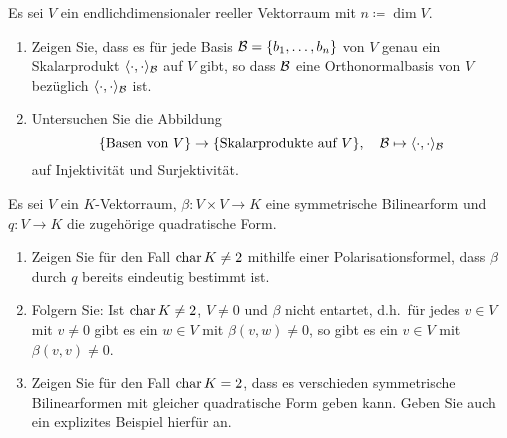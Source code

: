 \documentclass[a4paper,10pt]{scrartcl}
\begin{document}
\begin{question}
  Es sei $V$ ein endlichdimensionaler reeller Vektorraum mit $n \coloneqq \dim V$.
  \begin{enumerate}
    \item
      Zeigen Sie, dass es für jede Basis $\mathcal{B} = \{b_1, \dotsc, b_n\}$ von $V$ genau ein Skalarprodukt $\langle \cdot, \cdot \rangle_{\mathcal{B}}$ auf $V$ gibt, so dass $\mathcal{B}$ eine Orthonormalbasis von $V$ bezüglich $\langle \cdot, \cdot \rangle_{\mathcal{B}}$ ist.
    \item
      Untersuchen Sie die Abbildung
      \[
        \{\text{Basen von $V$}\} \to \{\text{Skalarprodukte auf $V$}\},
        \quad
        \mathcal{B} \mapsto \langle \cdot, \cdot \rangle_{\mathcal{B}}
      \]
      auf Injektivität und Surjektivität.
  \end{enumerate}
\end{question}














\begin{question}
  Es sei $V$ ein $K$-Vektorraum, $\beta \colon V \times V \to K$ eine symmetrische Bilinearform und $q \colon V \to K$ die zugehörige quadratische Form.
  \begin{enumerate}[leftmargin=*]
    \item
      Zeigen Sie für den Fall $\operatorname{char} K \neq 2$ mithilfe einer Polarisationsformel, dass $\beta$ durch $q$ bereits eindeutig bestimmt ist.
    \item
      Folgern Sie:
      Ist $\operatorname{char} K \neq 2$, $V \neq 0$ und $\beta$ nicht entartet, d.h.\ für jedes $v \in V$ mit $v \neq 0$ gibt es ein $w \in V$ mit $\beta(v, w) \neq 0$, so gibt es ein $v \in V$ mit $\beta(v,v) \neq 0$.
    \item
      Zeigen Sie für den Fall $\operatorname{char} K = 2$, dass es verschieden symmetrische Bilinearformen mit gleicher quadratische Form geben kann.
      Geben Sie auch ein explizites Beispiel hierfür an.
  \end{enumerate}
\end{question}
\end{document}
